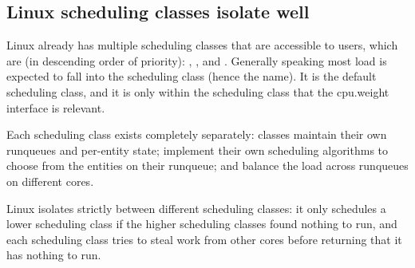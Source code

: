 \subsection{Linux scheduling classes isolate
well}\label{ss:approach:linux-classes-isolate}

Linux already has multiple scheduling classes that are accessible to users,
which are (in descending order of priority): \deadlineclass{}, \rtclass{}, and
\normalclass{}. Generally speaking most load is expected to fall into the
\normalclass{} scheduling class (hence the name). It is the default scheduling
class, and it is only within the \normalclass{} scheduling class that the
\cgroups{} cpu.weight interface is relevant.

Each scheduling class exists completely separately: classes maintain their own
runqueues and per-entity state; implement their own scheduling algorithms to
choose from the entities on their runqueue; and balance the load across
runqueues on different cores. 

Linux isolates strictly between different scheduling classes: it only schedules
a lower scheduling class if the higher scheduling classes found nothing to run,
and each scheduling class tries to steal work from other cores before returning
that it has nothing to run.

